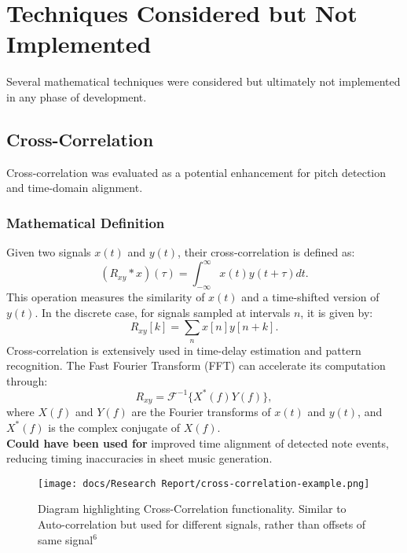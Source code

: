\documentclass{article}
\begin{document}
\newpage

\section{Techniques Considered but Not Implemented}
Several mathematical techniques were considered but ultimately not implemented in any phase of development.

\subsection{Cross-Correlation}
Cross-correlation was evaluated as a potential enhancement for pitch detection and time-domain alignment.

\subsubsection{Mathematical Definition}
Given two signals $x(t)$ and $y(t)$, their cross-correlation is defined as:
\begin{equation}
(R_{xy} \ast x)(\tau) = \int_{-\infty}^{\infty} x(t) y(t + \tau) dt.
\end{equation}
This operation measures the similarity of $x(t)$ and a time-shifted version of $y(t)$. In the discrete case, for signals sampled at intervals $n$, it is given by:
\begin{equation}
R_{xy}[k] = \sum_{n} x[n] y[n+k].
\end{equation}
Cross-correlation is extensively used in time-delay estimation and pattern recognition. The Fast Fourier Transform (FFT) can accelerate its computation through:
\begin{equation}
R_{xy} = \mathcal{F}^{-1} \{ X^*(f) Y(f) \},
\end{equation}
where $X(f)$ and $Y(f)$ are the Fourier transforms of $x(t)$ and $y(t)$, and $X^*(f)$ is the complex conjugate of $X(f)$. \\

\textbf{Could have been used for} improved time alignment of detected note events, reducing timing inaccuracies in sheet music generation.

\begin{figure}[h]
\texttt{[image: docs/Research Report/cross-correlation-example.png]}
\caption{Diagram highlighting Cross-Correlation functionality. Similar to Auto-correlation but used for different signals, rather than offsets of same signal$^6$}
\end{figure}
\end{document}
